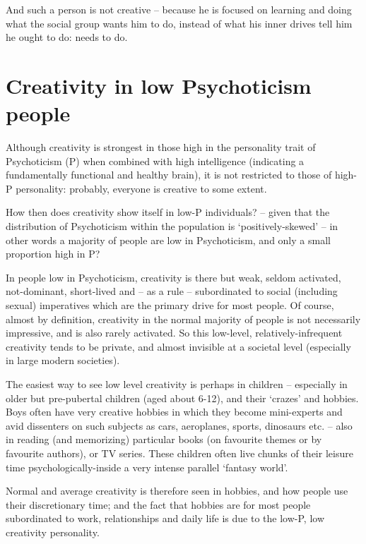 \documentclass[
]{book}
\begin{document}
And such a person is not creative -- because he is focused on learning and doing what the social group wants him to do, instead of what his inner drives tell him he ought to do: needs to do.

\hypertarget{creativity-in-low-psychoticism-people}{%
\section{Creativity in low Psychoticism people}\label{creativity-in-low-psychoticism-people}}

Although creativity is strongest in those high in the personality trait of Psychoticism (P) when combined with high intelligence (indicating a fundamentally functional and healthy brain), it is not restricted to those of high-P personality: probably, everyone is creative to some extent.

How then does creativity show itself in low-P individuals? -- given that the distribution of Psychoticism within the population is `positively-skewed' -- in other words a majority of people are low in Psychoticism, and only a small proportion high in P?

In people low in Psychoticism, creativity is there but weak, seldom activated, not-dominant, short-lived and -- as a rule -- subordinated to social (including sexual) imperatives which are the primary drive for most people. Of course, almost by definition, creativity in the normal majority of people is not necessarily impressive, and is also rarely activated. So this low-level, relatively-infrequent creativity tends to be private, and almost invisible at a societal level (especially in large modern societies).

The easiest way to see low level creativity is perhaps in children -- especially in older but pre-pubertal children (aged about 6-12), and their `crazes' and hobbies. Boys often have very creative hobbies in which they become mini-experts and avid dissenters on such subjects as cars, aeroplanes, sports, dinosaurs etc. -- also in reading (and memorizing) particular books (on favourite themes or by favourite authors), or TV series. These children often live chunks of their leisure time psychologically-inside a very intense parallel `fantasy world'.

Normal and average creativity is therefore seen in hobbies, and how people use their discretionary time; and the fact that hobbies are for most people subordinated to work, relationships and daily life is due to the low-P, low creativity personality.
\end{document}
